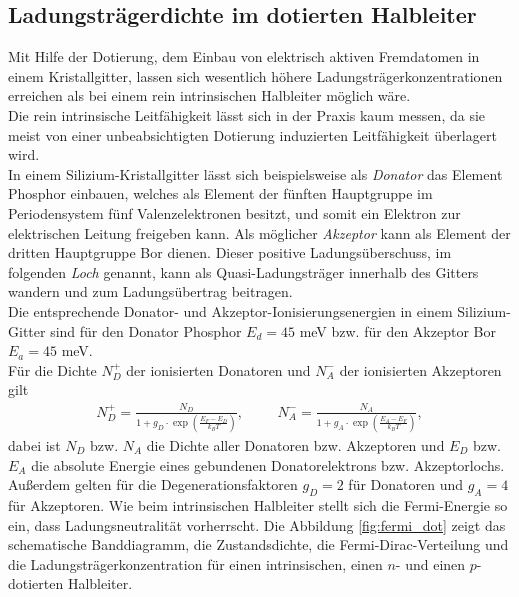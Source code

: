 \documentclass[a4paper,12pt]{article}
\begin{document}
\subsection{Ladungsträgerdichte im dotierten Halbleiter}
Mit Hilfe der Dotierung, dem Einbau von elektrisch aktiven Fremdatomen in einem Kristallgitter, lassen sich wesentlich höhere Ladungsträgerkonzentrationen erreichen als bei einem rein intrinsischen Halbleiter möglich wäre.\\
Die rein intrinsische Leitfähigkeit lässt sich in der Praxis kaum messen, da sie meist von einer unbeabsichtigten Dotierung induzierten Leitfähigkeit überlagert wird.\\
In einem Silizium-Kristallgitter lässt sich beispielsweise als \emph{Donator} das Element Phosphor einbauen, welches als Element der fünften Hauptgruppe im Periodensystem fünf Valenzelektronen besitzt, und somit ein Elektron zur elektrischen Leitung freigeben kann. Als möglicher \emph{Akzeptor} kann als Element der dritten Hauptgruppe Bor dienen. Dieser positive Ladungsüberschuss, im folgenden \emph{Loch} genannt, kann als Quasi-Ladungsträger innerhalb des Gitters wandern und zum Ladungsübertrag beitragen.\\
Die entsprechende Donator- und Akzeptor-Ionisierungsenergien in einem Silizium-Gitter sind für den Donator Phosphor $E_d=45$ meV bzw. für den Akzeptor Bor $E_a=45$ meV.\\
Für die Dichte $N_D^{+}$ der ionisierten Donatoren und $N_A^{-}$ der ionisierten Akzeptoren gilt
\begin{align}
N_D^{+}=\frac{N_D}{1+g_D\cdot\exp\left(\frac{E_F-E_D}{k_B T}\right)},\hspace{1cm}N_A^{-}=\frac{N_A}{1+g_A\cdot\exp\left(\frac{E_A-E_F}{k_B T}\right)},
\label{eq:don_acc_density}
\end{align}
dabei ist $N_D$ bzw. $N_A$ die Dichte aller Donatoren bzw. Akzeptoren und $E_D$ bzw. $E_A$ die absolute Energie eines gebundenen Donatorelektrons bzw. Akzeptorlochs. Außerdem gelten für die Degenerationsfaktoren $g_D=2$ für Donatoren und $g_A=4$ für Akzeptoren. Wie beim intrinsischen Halbleiter stellt sich die Fermi-Energie so ein, dass Ladungsneutralität vorherrscht. Die Abbildung \ref{fig:fermi_dot} zeigt das schematische Banddiagramm, die Zustandsdichte, die Fermi-Dirac-Verteilung und die Ladungsträgerkonzentration für einen intrinsischen, einen $n$- und einen $p$-dotierten Halbleiter.\\
\end{document}
